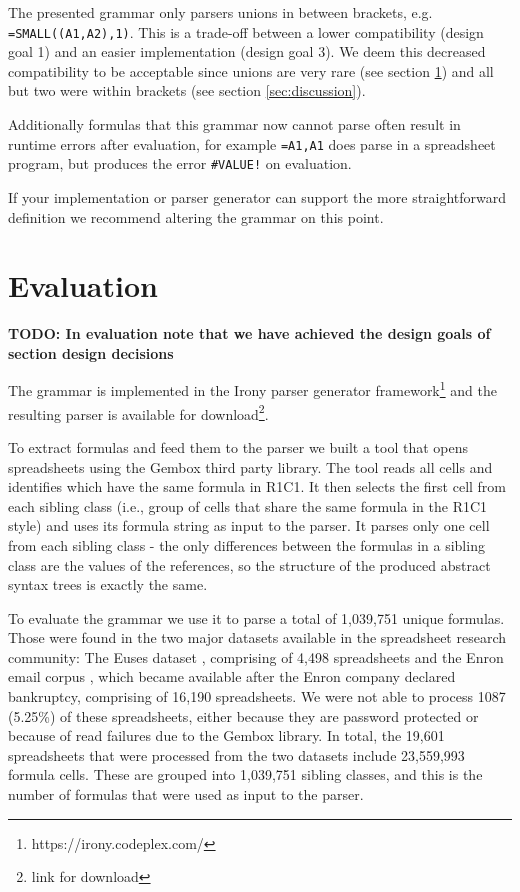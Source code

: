 \documentclass[conference]{IEEEtran}
\newcommand{\todo}[1]{\textbf{TODO: #1}}
\begin{document}
The presented grammar only parsers unions in between brackets, e.g. \texttt{=SMALL((A1,A2),1)}.
This is a trade-off between a lower compatibility (design goal 1) and an easier implementation (design goal 3).
We deem this decreased compatibility to be acceptable since unions are very rare (see section \ref{sec:evaluation}) and all but two were within brackets (see section \ref{sec:discussion}).

Additionally formulas that this grammar now cannot parse often result in runtime errors after evaluation, for example \texttt{=A1,A1} does parse in a spreadsheet program, but produces the error \texttt{\#VALUE!} on evaluation.

If your implementation or parser generator can support the more straightforward definition we recommend altering the grammar on this point.


\section{Evaluation}
\label{sec:evaluation}

\todo{In evaluation note that we have achieved the design goals of section design decisions}

The grammar is implemented in the Irony parser generator framework\footnote{https://irony.codeplex.com/} and the resulting parser is available for download\footnote{link for download}.

To extract formulas and feed them to the parser we built a tool that opens spreadsheets using the Gembox third party library. The tool reads all cells and identifies which have the same formula in R1C1. It then selects the first cell from each sibling class (i.e., group of cells that share the same formula in the R1C1 style) and uses its formula string as input to the parser. It parses only one cell from each sibling class - the only differences between the formulas in a sibling class are the values of the references, so the structure of the produced abstract syntax trees is exactly the same.

To evaluate the grammar we use it to parse a total of 1,039,751 unique formulas. Those were found in the two major datasets available in the spreadsheet research community: The Euses dataset \cite{euses}, comprising of 4,498 spreadsheets and the Enron email corpus \cite{enron}, which became available after the Enron company declared bankruptcy, comprising of 16,190 spreadsheets. We were not able to process 1087 (5.25\%) of these spreadsheets, either because they are password protected or because of read failures due to the Gembox library. In total, the 19,601 spreadsheets that were processed from the two datasets include 23,559,993 formula cells. These are grouped into 1,039,751 sibling classes, and this is the number of formulas that were used as input to the parser.
\end{document}
